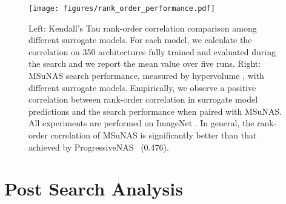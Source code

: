 \documentclass[runningheads]{llncs}
\def\ourmethod{MSuNAS}
\begin{document}
\begin{figure}[!bht]
    \centering
    \texttt{[image: figures/rank\_order\_performance.pdf]}
    \caption{Left: Kendall’s Tau \cite{kendalltau} rank-order correlation comparison among different surrogate models. For each model, we calculate the correlation on 350 architectures fully trained and evaluated during the search and we report the mean value over five runs. Right: \ourmethod{} search performance, measured by hypervolume \cite{hypervolume}, with different surrogate models. Empirically, we observe a positive correlation between rank-order correlation in surrogate model predictions and the search performance when paired with \ourmethod{}. All experiments are performed on ImageNet \cite{imagenet}. In general, the rank-order correlation of \ourmethod{}  is significantly better than that achieved by ProgressiveNAS~\cite{PNAS} (0.476).
    \label{fig:rank_order_performance}}
\end{figure}

\section{Post Search Analysis\label{sec:post}}
\end{document}

